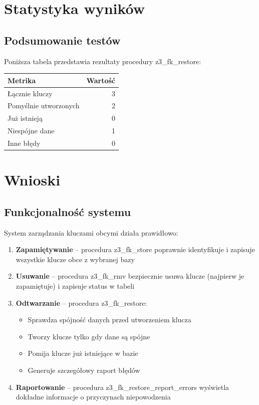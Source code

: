 \documentclass[a4paper,11pt]{article}
\begin{document}
	\section{Statystyka wyników}
	
	\subsection{Podsumowanie testów}
	
	Poniższa tabela przedstawia rezultaty procedury z3\_fk\_restore:
	
	\begin{center}
		\begin{tabular}{|l|r|}
			\hline
			\textbf{Metrika} & \textbf{Wartość} \\
			\hline
			Łącznie kluczy & 3 \\
			\hline
			Pomyślnie utworzonych & 2 \\
			\hline
			Już istnieją & 0 \\
			\hline
			Niespójne dane & 1 \\
			\hline
			Inne błędy & 0 \\
			\hline
		\end{tabular}
	\end{center}
	
	\section{Wnioski}
	
	\subsection{Funkcjonalność systemu}
	
	System zarządzania kluczami obcymi działa prawidłowo:
	
	\begin{enumerate}
		\item \textbf{Zapamiętywanie} -- procedura z3\_fk\_store poprawnie identyfikuje i zapisuje wszystkie klucze obce z wybranej bazy
		\item \textbf{Usuwanie} -- procedura z3\_fk\_rmv bezpiecznie usuwa klucze (najpierw je zapamiętuje) i zapisuje status w tabeli
		\item \textbf{Odtwarzanie} -- procedura z3\_fk\_restore:
		\begin{itemize}
			\item Sprawdza spójność danych przed utworzeniem klucza
			\item Tworzy klucze tylko gdy dane są spójne
			\item Pomija klucze już istniejące w bazie
			\item Generuje szczegółowy raport błędów
		\end{itemize}
		\item \textbf{Raportowanie} -- procedura z3\_fk\_restore\_report\_errors wyświetla dokładne informacje o przyczynach niepowodzenia
	\end{enumerate}
	
\end{document}
